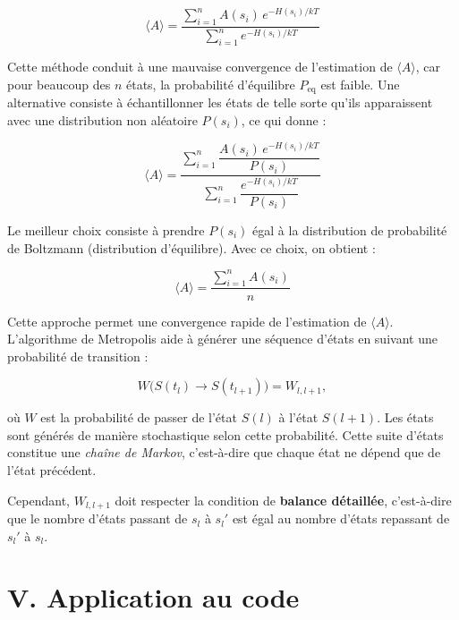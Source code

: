 \documentclass[a4paper,11pt]{article}
\begin{document}
\begin{equation}
\langle A \rangle =
\frac{\sum_{i=1}^{n} A(s_i)\, e^{-H(s_i)/kT}}
     {\sum_{i=1}^{n} e^{-H(s_i)/kT}}
\tag{4}
\end{equation}

Cette méthode conduit à une mauvaise convergence de l’estimation de $\langle A \rangle$, car pour beaucoup des $n$ états, la probabilité d’équilibre $P_{\text{eq}}$ est faible.  
Une alternative consiste à échantillonner les états de telle sorte qu’ils apparaissent avec une distribution non aléatoire $P(s_i)$, ce qui donne :  

\begin{equation}
\langle A \rangle =
\frac{\sum_{i=1}^{n} \dfrac{A(s_i)\, e^{-H(s_i)/kT}}{P(s_i)}}
     {\sum_{i=1}^{n} \dfrac{e^{-H(s_i)/kT}}{P(s_i)}}
\tag{5}
\end{equation}

Le meilleur choix consiste à prendre $P(s_i)$ égal à la distribution de probabilité de Boltzmann (distribution d’équilibre). Avec ce choix, on obtient :  

\begin{equation}
\langle A \rangle = \frac{\sum_{i=1}^n A(s_i)}{n}
\label{eq:boltzmann}
\end{equation}

Cette approche permet une convergence rapide de l’estimation de $\langle A \rangle$.  
L’algorithme de Metropolis aide à générer une séquence d’états en suivant une probabilité de transition :  

\begin{equation}
W\big(S(t_l) \rightarrow S(t_{l+1})\big) = W_{l,l+1},
\label{eq:transition}
\end{equation}

où $W$ est la probabilité de passer de l’état $S(l)$ à l’état $S(l+1)$.  
Les états sont générés de manière stochastique selon cette probabilité. Cette suite d’états constitue une \emph{chaîne de Markov}, c’est-à-dire que chaque état ne dépend que de l’état précédent.  

Cependant, $W_{l,l+1}$ doit respecter la condition de \textbf{balance détaillée}, c’est-à-dire que le nombre d’états passant de $s_l$ à $s_l'$ est égal au nombre d’états repassant de $s_l'$ à $s_l$.  

\section*{V. Application au code}
\end{document}
